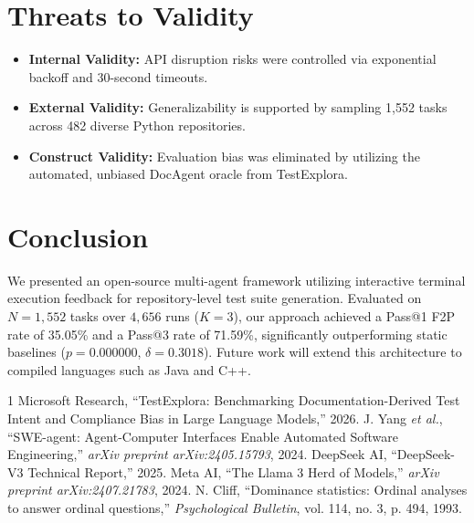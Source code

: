 \documentclass[conference]{IEEEtran}
\begin{document}
\section{Threats to Validity}
\begin{itemize}
    \item \textbf{Internal Validity:} API disruption risks were controlled via exponential backoff and 30-second timeouts.
    \item \textbf{External Validity:} Generalizability is supported by sampling 1,552 tasks across 482 diverse Python repositories.
    \item \textbf{Construct Validity:} Evaluation bias was eliminated by utilizing the automated, unbiased DocAgent oracle from TestExplora.
\end{itemize}

\section{Conclusion}
We presented an open-source multi-agent framework utilizing interactive terminal execution feedback for repository-level test suite generation. Evaluated on $N=1,552$ tasks over $4,656$ runs ($K=3$), our approach achieved a Pass@1 F2P rate of 35.05\% and a Pass@3 rate of 71.59\%, significantly outperforming static baselines ($p=0.000000$, $\delta=0.3018$). Future work will extend this architecture to compiled languages such as Java and C++.

\begin{thebibliography}{1}
Microsoft Research, ``TestExplora: Benchmarking Documentation-Derived Test Intent and Compliance Bias in Large Language Models,'' 2026.
J. Yang \textit{et al.}, ``SWE-agent: Agent-Computer Interfaces Enable Automated Software Engineering,'' \textit{arXiv preprint arXiv:2405.15793}, 2024.
DeepSeek AI, ``DeepSeek-V3 Technical Report,'' 2025.
Meta AI, ``The Llama 3 Herd of Models,'' \textit{arXiv preprint arXiv:2407.21783}, 2024.
N. Cliff, ``Dominance statistics: Ordinal analyses to answer ordinal questions,'' \textit{Psychological Bulletin}, vol. 114, no. 3, p. 494, 1993.
\end{thebibliography}
\end{document}
